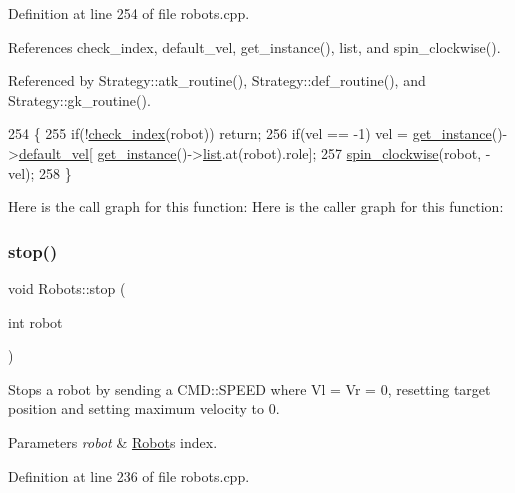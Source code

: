 Definition at line 254 of file robots.\+cpp.



References check\+\_\+index, default\+\_\+vel, get\+\_\+instance(), list, and spin\+\_\+clockwise().



Referenced by Strategy\+::atk\+\_\+routine(), Strategy\+::def\+\_\+routine(), and Strategy\+::gk\+\_\+routine().


\begin{DoxyCode}
254                                                         \{
255     \textcolor{keywordflow}{if}(!\hyperlink{robots_8hpp_ae3e6ae8f87cdc750c0b99bc609d9ae43}{check\_index}(robot)) \textcolor{keywordflow}{return};
256     \textcolor{keywordflow}{if}(vel == -1) vel = \hyperlink{class_robots_a589bce74db5f34af384952d48435168f}{get\_instance}()->\hyperlink{class_robots_a6c03d49137645a67d5c5e39bb953a788}{default\_vel}[
      \hyperlink{class_robots_a589bce74db5f34af384952d48435168f}{get\_instance}()->\hyperlink{class_robots_a2c6b77265028f82a4342ca1ef15ed305}{list}.at(robot).role];
257     \hyperlink{class_robots_a6bd2e21654da3f7c3acc380a2b838240}{spin\_clockwise}(robot, -vel);
258 \}
\end{DoxyCode}
Here is the call graph for this function\+:
Here is the caller graph for this function\+:
\mbox{\label{class_robots_ac3452d86940fa017a16f7be4fe099d89}} 
\subsubsection{\texorpdfstring{stop()}{stop()}}
{\footnotesize\ttfamily void Robots\+::stop (\begin{DoxyParamCaption}\item[{int}]{robot }\end{DoxyParamCaption})\hspace{0.3cm}{\ttfamily [static]}}

Stops a robot by sending a C\+M\+D\+::\+S\+P\+E\+ED where Vl = Vr = 0, resetting target position and setting maximum velocity to 0. 
\begin{DoxyParams}{Parameters}
{\em robot} & \hyperlink{struct_robots_1_1_robot}{Robot}\textquotesingle{}s index. \\
\hline
\end{DoxyParams}


Definition at line 236 of file robots.\+cpp.



